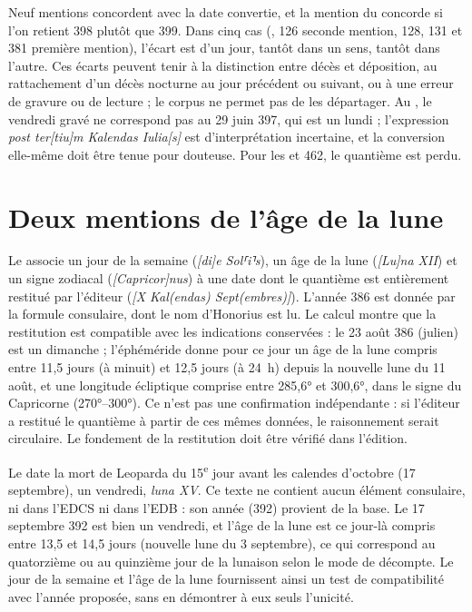 

Neuf mentions concordent avec la date convertie, et la mention du  concorde si l’on retient 398 plutôt que 399. Dans cinq cas (, 126 seconde mention, 128, 131 et 381 première mention), l’écart est d’un jour, tantôt dans un sens, tantôt dans l’autre. Ces écarts peuvent tenir à la distinction entre décès et déposition, au rattachement d’un décès nocturne au jour précédent ou suivant, ou à une erreur de gravure ou de lecture ; le corpus ne permet pas de les départager. Au , le vendredi gravé ne correspond pas au 29 juin 397, qui est un lundi ; l’expression \emph{post ter[tiu]m Kalendas Iulia[s]} est d’interprétation incertaine, et la conversion elle-même doit être tenue pour douteuse. Pour les  et 462, le quantième est perdu.

\section{Deux mentions de l’âge de la lune}

Le  associe un jour de la semaine (\emph{[di]e Sol⸢i⸣s}), un âge de la lune (\emph{[Lu]na XII}) et un signe zodiacal (\emph{[Capricor]nus}) à une date dont le quantième est entièrement restitué par l’éditeur (\emph{[X Kal(endas) Sept(embres)]}). L’année 386 est donnée par la formule consulaire, dont le nom d’Honorius est lu. Le calcul montre que la restitution est compatible avec les indications conservées : le 23 août 386 (julien) est un dimanche ; l’éphéméride donne pour ce jour un âge de la lune compris entre 11,5 jours (à minuit) et 12,5 jours (à 24~h) depuis la nouvelle lune du 11 août, et une longitude écliptique comprise entre 285,6° et 300,6°, dans le signe du Capricorne (270°–300°). Ce n’est pas une confirmation indépendante : si l’éditeur a restitué le quantième à partir de ces mêmes données, le raisonnement serait circulaire. Le fondement de la restitution doit être vérifié dans l’édition.

Le  date la mort de Leoparda du 15\textsuperscript{e} jour avant les calendes d’octobre (17 septembre), un vendredi, \emph{luna XV}. Ce texte ne contient aucun élément consulaire, ni dans l’EDCS ni dans l’EDB : son année (392) provient de la base. Le 17 septembre 392 est bien un vendredi, et l’âge de la lune est ce jour-là compris entre 13,5 et 14,5 jours (nouvelle lune du 3 septembre), ce qui correspond au quatorzième ou au quinzième jour de la lunaison selon le mode de décompte. Le jour de la semaine et l’âge de la lune fournissent ainsi un test de compatibilité avec l’année proposée, sans en démontrer à eux seuls l’unicité.

